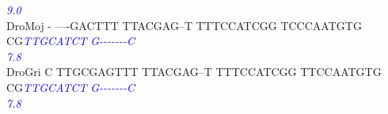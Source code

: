 \documentclass[11pt,twoside,reqno,a4paper]{article}
\begin{document}
{\hspace*{7\charwidth}\hspace*{1\charwidth}\hspace*{1\charwidth}\hspace*{1\charwidth}\hspace*{1\charwidth}\hspace*{1\charwidth}\hspace*{43\charwidth}\textit{\textcolor{Blue}{9.0}}\hspace*{1\charwidth}\\
DroMoj	-	----GACTTT	TTACGAG--T	TTTCCATCGG	TCCCAATGTG	CG\textit{\textcolor{Blue}{T}}\textit{\textcolor{Blue}{T}}\textit{\textcolor{Blue}{G}}\textit{\textcolor{Blue}{C}}\textit{\textcolor{Blue}{A}}\textit{\textcolor{Blue}{T}}\textit{\textcolor{Blue}{C}}\textit{\textcolor{Blue}{T}}	\textit{\textcolor{Blue}{G}}\textit{\textcolor{Blue}{-}}\textit{\textcolor{Blue}{-}}\textit{\textcolor{Blue}{-}}\textit{\textcolor{Blue}{-}}\textit{\textcolor{Blue}{-}}\textit{\textcolor{Blue}{-}}\textit{\textcolor{Blue}{-}}\textit{\textcolor{Blue}{C}}\\
\hspace*{7\charwidth}\hspace*{1\charwidth}\hspace*{1\charwidth}\hspace*{1\charwidth}\hspace*{1\charwidth}\hspace*{1\charwidth}\hspace*{43\charwidth}\textit{\textcolor{Blue}{7.8}}\hspace*{1\charwidth}\\
DroGri	C	TTGCGAGTTT	TTACGAG--T	TTTCCATCGG	TTCCAATGTG	CG\textit{\textcolor{Blue}{T}}\textit{\textcolor{Blue}{T}}\textit{\textcolor{Blue}{G}}\textit{\textcolor{Blue}{C}}\textit{\textcolor{Blue}{A}}\textit{\textcolor{Blue}{T}}\textit{\textcolor{Blue}{C}}\textit{\textcolor{Blue}{T}}	\textit{\textcolor{Blue}{G}}\textit{\textcolor{Blue}{-}}\textit{\textcolor{Blue}{-}}\textit{\textcolor{Blue}{-}}\textit{\textcolor{Blue}{-}}\textit{\textcolor{Blue}{-}}\textit{\textcolor{Blue}{-}}\textit{\textcolor{Blue}{-}}\textit{\textcolor{Blue}{C}}\\
\hspace*{7\charwidth}\hspace*{1\charwidth}\hspace*{1\charwidth}\hspace*{1\charwidth}\hspace*{1\charwidth}\hspace*{1\charwidth}\hspace*{43\charwidth}\textit{\textcolor{Blue}{7.8}}\hspace*{1\charwidth}\\
}
\end{document}
